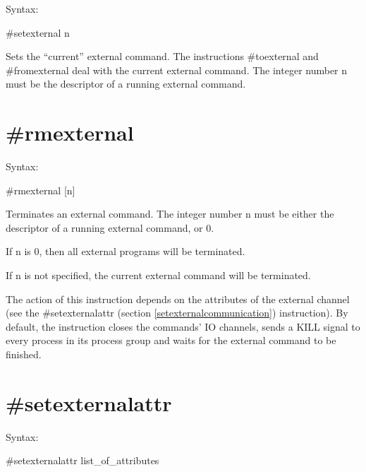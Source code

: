 \noindent Syntax:

\#setexternal n

\noindent Sets the ``current'' external command. The 
instructions \#toexternal and 
\#fromexternal deal with the current external 
command.  The integer number n must be the descriptor of a running external 
command.


\section{\#rmexternal}
\label{rmexternalcommunication}

\noindent Syntax:

\#rmexternal [n]

\noindent Terminates an external command. The integer 
number n must be either the descriptor of a running external command, or 0.

If n is 0, then all external programs will be terminated.

If n is not specified, the current external command will be terminated.

The action of this instruction depends on the attributes of the external 
channel (see the \#setexternalattr (section 
\ref{setexternalcommunication}) instruction). By default, the instruction 
closes the commands' IO channels, sends a KILL signal to 
every process in its process group and waits for the external command to be 
finished.


\section{\#setexternalattr}
\label{setexternalattrcommunication}

\noindent Syntax:

\#setexternalattr list\_of\_attributes

